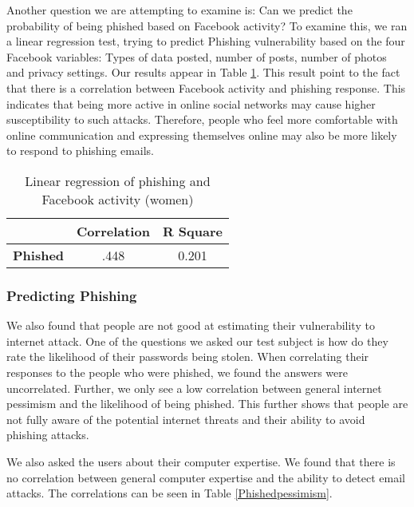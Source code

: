 \documentclass{sig-alternate}
\begin{document}
Another question we are attempting to examine is: Can we predict the probability of being phished based on Facebook activity? To examine this, we ran a linear regression test, trying to predict Phishing vulnerability based on the four Facebook variables: Types of data posted, number of posts, number of photos and privacy settings. Our results appear in Table \ref{PhishFBTablewomen}.
This result point to the fact that there is a correlation between Facebook activity and phishing response. This indicates that 
being more active in online social networks
may cause higher susceptibility
to such attacks. Therefore, people who feel more comfortable with online communication and expressing themselves online may also be more likely to respond to phishing emails. 




\begin{table}
\begin{center}
\begin{tabular}{|c|c|c|}
\hline
&  \textbf{Correlation} & \textbf{R Square} \\
\hline
\hline
\textbf{Phished} &  .448 &	0.201 	\\
\hline

\end{tabular}

\vspace{5mm}


\caption{Linear regression of phishing and Facebook activity (women)}
\label{PhishFBTablewomen}
\end{center}
\end{table}

\subsubsection{Predicting Phishing}

We also found that people are not good at estimating their vulnerability to internet attack. One of the questions we asked our test subject is how do they rate the likelihood of their passwords being stolen. When correlating their responses to the people who were phished, we found the answers were uncorrelated. Further, we only see a low correlation between general internet pessimism and the likelihood of being phished. This further shows that people are not fully aware of the potential internet threats and their ability to avoid phishing attacks.

We also asked the users about their computer expertise. We found that there is no correlation between general computer expertise and the ability to detect email attacks.
The correlations can be seen in Table \ref{Phishedpessimism}.
\end{document}
